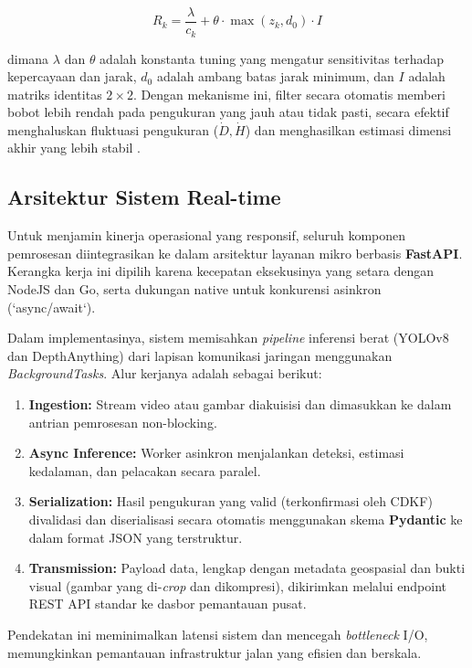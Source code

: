 \documentclass{iopjournal}
\begin{document}
\begin{equation}
R_k = \frac{\lambda}{c_k} + \theta \cdot \max(z_k, d_0) \cdot I
\end{equation}

dimana $\lambda$ dan $\theta$ adalah konstanta tuning yang mengatur sensitivitas terhadap kepercayaan dan jarak, $d_0$ adalah ambang batas jarak minimum, dan $I$ adalah matriks identitas $2 \times 2$. Dengan mekanisme ini, filter secara otomatis memberi bobot lebih rendah pada pengukuran yang jauh atau tidak pasti, secara efektif menghaluskan fluktuasi pengukuran ($\dot{D}, \dot{H}$) dan menghasilkan estimasi dimensi akhir yang lebih stabil \cite{rahman2025}.

\subsection{Arsitektur Sistem Real-time}
Untuk menjamin kinerja operasional yang responsif, seluruh komponen pemrosesan diintegrasikan ke dalam arsitektur layanan mikro berbasis \textbf{FastAPI}. Kerangka kerja ini dipilih karena kecepatan eksekusinya yang setara dengan NodeJS dan Go, serta dukungan native untuk konkurensi asinkron (`async/await`).

Dalam implementasinya, sistem memisahkan \textit{pipeline} inferensi berat (YOLOv8 dan DepthAnything) dari lapisan komunikasi jaringan menggunakan \textit{BackgroundTasks}. Alur kerjanya adalah sebagai berikut:
\begin{enumerate}
    \item \textbf{Ingestion:} Stream video atau gambar diakuisisi dan dimasukkan ke dalam antrian pemrosesan non-blocking.
    \item \textbf{Async Inference:} Worker asinkron menjalankan deteksi, estimasi kedalaman, dan pelacakan secara paralel.
    \item \textbf{Serialization:} Hasil pengukuran yang valid (terkonfirmasi oleh CDKF) divalidasi dan diserialisasi secara otomatis menggunakan skema \textbf{Pydantic} ke dalam format JSON yang terstruktur.
    \item \textbf{Transmission:} Payload data, lengkap dengan metadata geospasial dan bukti visual (gambar yang di-\textit{crop} dan dikompresi), dikirimkan melalui endpoint REST API standar ke dasbor pemantauan pusat.
\end{enumerate}

Pendekatan ini meminimalkan latensi sistem dan mencegah \textit{bottleneck} I/O, memungkinkan pemantauan infrastruktur jalan yang efisien dan berskala.
\end{document}
